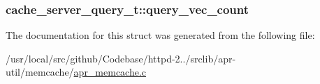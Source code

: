 \subsubsection[{\texorpdfstring{query\+\_\+vec\+\_\+count}{query_vec_count}}]{ cache\+\_\+server\+\_\+query\+\_\+t\+::query\+\_\+vec\+\_\+count}\hypertarget{structcache__server__query__t_af0d394bb44953b027cfb60faba34f45c}{}\label{structcache__server__query__t_af0d394bb44953b027cfb60faba34f45c}


The documentation for this struct was generated from the following file\+:\begin{DoxyCompactItemize}
\item 
/usr/local/src/github/\+Codebase/httpd-\/2../srclib/apr-\/util/memcache/\hyperlink{apr__memcache_8c}{apr\+\_\+memcache.\+c}\end{DoxyCompactItemize}
